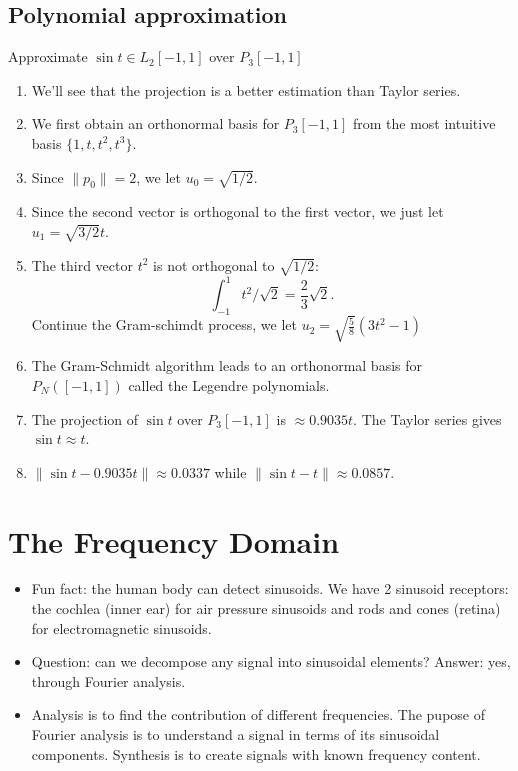\documentclass[../main.tex]{subfiles}
\begin{document}
\subsection{Polynomial approximation}
\begin{pbox}{{Approximate $\sin t\in L_2[-1,1]$ over $P_3[-1,1]$}}
    \begin{enumerate}
        \item We'll see that the projection is a better estimation than Taylor series.
        \item We first obtain an orthonormal basis for $P_3[-1,1]$ from the most intuitive basis $\{1,t,t^2,t^3\}$.
        \item Since $\|p_0\|=2$, we let $u_0=\sqrt{1/2}$.
        \item Since the second vector is orthogonal to the first vector, we just let $u_1=\sqrt{3/2}t$.
        \item The third vector $t^2$ is not orthogonal to $\sqrt{1/2}$: \[
        \int_{-1}^1 t^2/\sqrt{2}=\frac{2}{3}\sqrt{2}.
        \]
        Continue the Gram-schimdt process, we let $u_2=\sqrt{\frac{5}{8}}(3t^2-1)$
        \item The Gram-Schmidt algorithm leads to an orthonormal basis for $P_N([-1,1])$ called the Legendre polynomials.
        \item The projection of $\sin t$ over $P_3[-1,1]$ is $\approx 0.9035 t$. The Taylor series gives $\sin t\approx t$.
        \item $\|\sin t - 0.9035 t\|\approx 0.0337$ while $\|\sin t -t\|\approx 0.0857$.
    \end{enumerate}
\end{pbox}
\section{The Frequency Domain}
\begin{itemize}
    \item Fun fact: the human body can detect sinusoids. We have 2 sinusoid receptors: the cochlea (inner ear) for air pressure sinusoids and rods and cones (retina) for electromagnetic sinusoids.
    \item Question: can we decompose any signal into sinusoidal elements? Answer: yes, through Fourier analysis. 
    \item Analysis is to find the contribution of different frequencies. The pupose of Fourier analysis is to understand a signal in terms of its sinusoidal components. Synthesis is to create signals with known frequency content.
\end{itemize}
\end{document}
